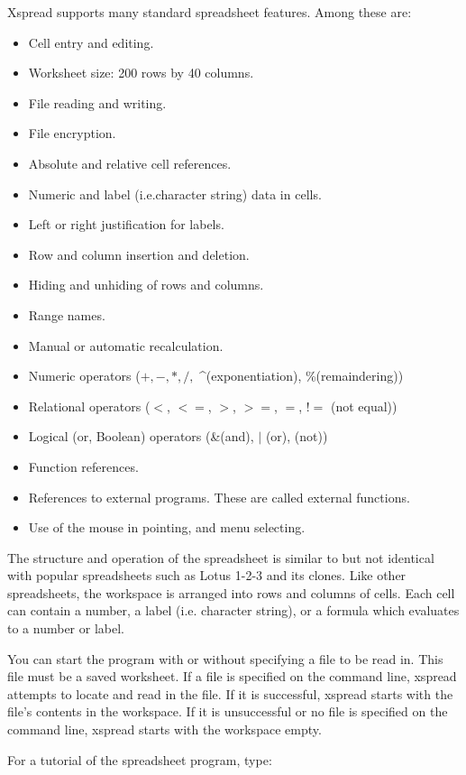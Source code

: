     Xspread supports many standard spreadsheet features.  Among these are:
\begin{itemize}
\item{Cell entry and editing.}
\item{ Worksheet size:  200 rows by 40 columns.}
\item{File reading and writing.}
\item{File encryption.}
\item{Absolute and relative cell references.}
\item{Numeric and label (i.e.character string) data in cells.}
\item{Left or right justification for labels.}
\item{Row and column insertion and deletion.}
\item{Hiding and unhiding of rows and columns.}
\item{Range names.}
\item{Manual or automatic recalculation.}
\item{Numeric operators ($+, -, *, /,$ \^{ }(exponentiation), \%(remaindering))}
\item{Relational operators ($<$, $<=$, $>$, $>=$, $=$, $!=$ (not equal))}
\item{Logical (or, Boolean) operators (\&(and), $|$ (or), \twiddle (not))}
\item{Function references.}
\item{References to external programs. These are called external functions.}
\item{Use of the mouse in pointing, and menu selecting.}
\end{itemize}

    The structure and operation of the spreadsheet is similar to but not 
identical with popular spreadsheets such as Lotus 1-2-3 and its clones.  Like 
other spreadsheets, the workspace is arranged into rows and columns of cells.  
Each cell can contain a number, a label (i.e. character string), or a formula 
which evaluates to a number or label.

    You can start the program with or without specifying a file to be read in.  
This file must be a saved worksheet.  If a file is specified on the command 
line, xspread attempts to locate and read in the file.  If it is successful, 
xspread starts with the file's contents in the workspace.  If it is 
unsuccessful or no file is specified on the command line, xspread starts with 
the workspace empty.

    For a tutorial of the spreadsheet program, type:


